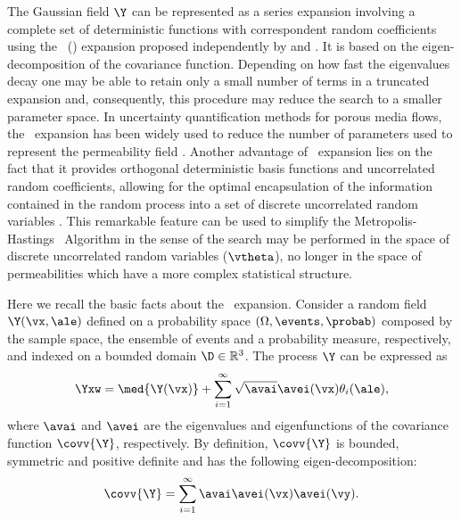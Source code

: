 The Gaussian field $\Y$ can be represented as a series expansion involving a complete set of deterministic functions with correspondent random coefficients using the \KL\ (\kl) expansion proposed independently by \cite{karhunen46} and \cite{loeve55}. 
It is based on the eigen-decomposition of the covariance function.
Depending on how fast the eigenvalues decay one may be able to  retain only a small number of terms in a truncated expansion and, consequently, this procedure may reduce the search to a smaller parameter space.
In uncertainty quantification methods for porous media flows, the \kl\ expansion has been widely used to reduce the number of parameters used to represent the permeability field \citep{efendiev05,efendiev2006,das10,mondal10,ginting11,ginting12}.
Another advantage of \kl\ expansion lies on the fact that it provides orthogonal deterministic basis functions and uncorrelated random coefficients, allowing for the optimal encapsulation of the information contained in the random process into a set of discrete uncorrelated random variables \citep{GhanemSpanos}. 
This remarkable feature can be used to simplify the Metropolis-Hastings \mcmc\ Algorithm in the sense of the search may be performed in the space of discrete uncorrelated random variables ($\vtheta$), no longer in the space of permeabilities which have a more complex statistical structure.

Here we recall the basic facts about the \KL\ expansion. 
Consider a random field $\Y(\vx,\ale)$ defined on a probability space $(\Omega,\events,\probab)$ composed by the sample space, the ensemble of events and a probability measure, respectively, and indexed on a bounded domain $\D \in \mathbb{R}^{3}$.
The process $\Y$ can be expressed as 
%
\begin{equation}
  \Yxw = \med{\Y(\vx)} +\sum_{i=1}^{\infty}\sqrt{\avai} \avei(\vx)
\theta_{i}(\ale),
\label{kl}
\end{equation}
%
\noindent where $\avai$ and $\avei$ are the eigenvalues and eigenfunctions of the covariance function $\covv{\Y}$, respectively. 
By definition, $\covv{\Y}$ is bounded, symmetric and positive definite and has the following eigen-decomposition:
%
\begin{equation*}
  \covv{\Y} = \sum_{i=1}^{\infty} \avai\avei(\vx)\avei(\vy).
\label{klcov}
\end{equation*}
%

